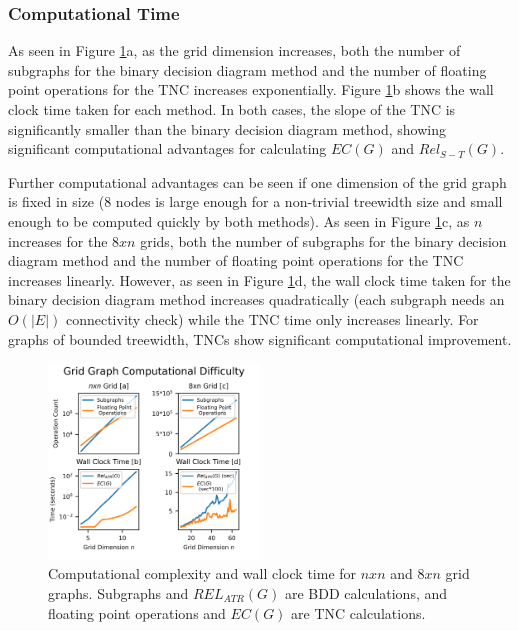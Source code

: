 \hypertarget{computational-time}{%
\subsubsection{Computational Time}\label{computational-time}}

As seen in Figure \ref{fig:Grid Graph Computational Time}a, as the grid dimension increases, both the number of subgraphs for the binary decision diagram method and the number of floating point operations for the TNC increases exponentially. Figure \ref{fig:Grid Graph Computational Time}b shows the wall clock time taken for each method. In both cases, the slope of the TNC is significantly smaller than the binary decision diagram method, showing significant computational advantages for calculating \(EC(G)\) and \(Rel_{S-T}(G)\).

Further computational advantages can be seen if one dimension of the grid graph is fixed in size (8 nodes is large enough for a non-trivial treewidth size and small enough to be computed quickly by both methods). As seen in Figure \ref{fig:Grid Graph Computational Time}c, as \(n\) increases for the \(8xn\) grids, both the number of subgraphs for the binary decision diagram method and the number of floating point operations for the TNC increases linearly. However, as seen in Figure \ref{fig:Grid Graph Computational Time}d, the wall clock time taken for the binary decision diagram method increases quadratically (each subgraph needs an \(O(|E|)\) connectivity check) while the TNC time only increases linearly. For graphs of bounded treewidth, TNCs show significant computational improvement.

\begin{figure}[t]
\caption{Computational complexity and wall clock time for $nxn$ and $8xn$ grid graphs. Subgraphs and $REL_{ATR}(G)$ are BDD calculations, and floating point operations and $EC(G)$ are TNC calculations.}
\label{fig:Grid Graph Computational Time}
\includegraphics[width=0.5\textwidth]{../figures/GridGraphComputeTime8.png}
\end{figure}

